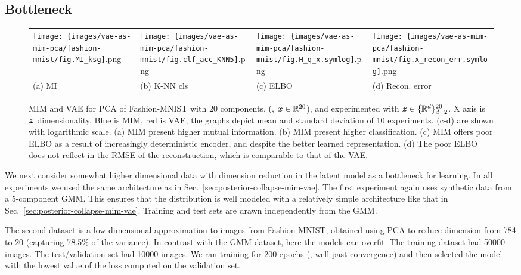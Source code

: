 \subsection{Bottleneck}

\begin{figure}[t]
    \centering
    \setlength{\tabcolsep}{0pt}
    \begin{tabular}{*4{>{\centering\arraybackslash}m{}}}
      \texttt{[image: \{images/vae-as-mim-pca/fashion-mnist/fig.MI\_ksg]}.png}
    & \texttt{[image: \{images/vae-as-mim-pca/fashion-mnist/fig.clf\_acc\_KNN5]}.png}
    & \texttt{[image: \{images/vae-as-mim-pca/fashion-mnist/fig.H\_q\_x.symlog]}.png}
    & \texttt{[image: \{images/vae-as-mim-pca/fashion-mnist/fig.x\_recon\_err.symlog]}.png}
    \\
    (a) MI & (b) K-NN cls & (c) ELBO & (d) Recon. error
    \end{tabular}
    \caption{MIM and VAE for PCA of Fashion-MNIST with 20 components, (\ie, ${\boldsymbol{x}} \in \mathbb{R}^{20}$), and experimented with ${\boldsymbol z} \in \{ \mathbb{R}^d  \}_{d=2}^{20}$. X axis is ${\boldsymbol z}$ dimensionality. Blue is MIM, red is VAE, the graphs depict mean and standard deviation of 10 experiments. (c-d) are shown with logarithmic scale.
    (a) MIM present higher mutual information. (b) MIM present higher classification. (c) MIM offers poor ELBO as a result of increasingly deterministic encoder, and despite the better learned representation. (d) The poor ELBO does not reflect in the RMSE of the reconstruction, which is comparable to that of the VAE.
    }
    \label{fig:mim-vs-vae-image-quantitative-bottleneck}
\end{figure}

We next consider somewhat higher dimensional data with dimension 
reduction in the latent model as a bottleneck for learning. In all experiments we used the same architecture as in 
Sec.\ \ref{sec:posterior-collapse-mim-vae}.
The first experiment again uses synthetic data from a 5-component GMM. 
This ensures that the distribution is well modeled with a relatively simple
architecture like that in Sec.\ \ref{sec:posterior-collapse-mim-vae}.
Training and test sets are drawn independently from the GMM.

The second dataset is a low-dimensional approximation to images from
Fashion-MNIST, obtained using PCA to reduce dimension from 784 to 20
(capturing 78.5\% of the variance).  
In contrast with the GMM dataset, here the models can overfit.
The training dataset had 50000 images.  The test/validation set had
10000 images.
We ran training for 200 epochs (\ie, well past convergence) and then selected the model with 
the lowest value of the loss computed on the validation set.

